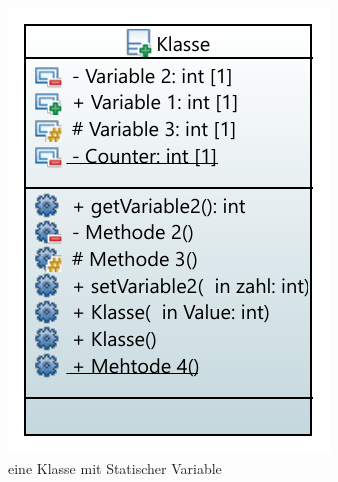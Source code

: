   \begin{figure}[H]
 	\centering
 	 	\includegraphics[scale=1.2]{bilder/pdfvorlagen/model3}
 	\caption[eine Klasse mit Statischer Variable]{eine Klasse mit Statischer Variable}
 	\label{fig:klassestatic}
 \end{figure}
\cite{HelmutErlenkotter.}
\cite{Prof.Dr.AlfredIrber.}
\cite{Krau.}
